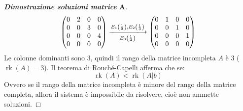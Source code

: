 \documentclass[a4paper]{article}
\makeatletter
\DeclareMathOperator{\rk}{rk}
\newenvironment{rowequmat}[1]{\left(\array{@{}#1@{}}}{\endarray\right)}
\makeatother
\begin{document}
\begin{proof}[\textbf{Dimostrazione soluzioni matrice} $\boldsymbol{A}$]
\begin{gather*}
			\begin{rowequmat}{cccc}
				0 & 2 & 0 & 0 \\
				0 & 0 & 3 & 0 \\
				0 & 0 & 0 & 4 \\
				0 & 0 & 0 & 0
			\end{rowequmat} \xlongrightarrow[E_{3}\left(\frac{1}{4}\right)]{E_{1}\left(\frac{1}{2}\right), E_{2}\left(\frac{1}{3}\right)}
			\begin{rowequmat}{cccc}
				0 & 1 & 0 & 0 \\
				0 & 0 & 1 & 0 \\
				0 & 0 & 0 & 1 \\
				0 & 0 & 0 & 0
			\end{rowequmat}
		\end{gather*}
		Le colonne dominanti sono $3$, quindi il rango della matrice incompleta $A$ è $3$ ($\rk\left(A\right) = 3$). Il teorema di Rouché-Capelli afferma che se:
		\begin{equation*}
			\rk\left(A\right) < \rk\left(A|b\right)
		\end{equation*}
		Ovvero se il rango della matrice incompleta è minore del rango della matrice completa, allora il sistema è impossibile da risolvere, cioè non ammette soluzioni.
	\end{proof}\newpage
\end{document}
